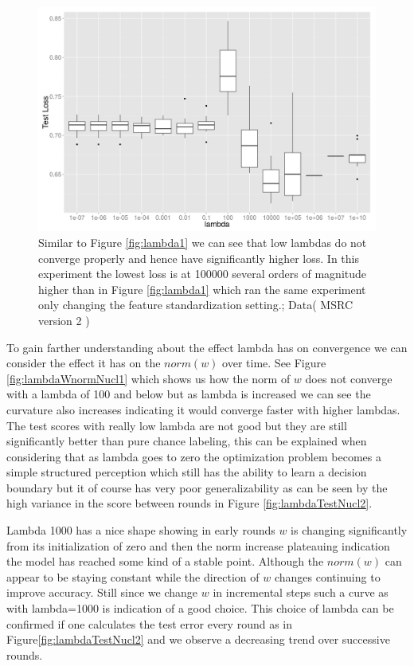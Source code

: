 \begin{figure}
  \centering
  \includegraphics[width=1.0\textwidth]{images/testError_vs_lambda_msrc_stdON.png}
  \caption{  Similar to Figure \ref{fig:lambda1} we can see that low lambdas do not converge properly and hence have significantly higher loss. In this experiment the lowest loss is at 100000 several orders of magnitude higher than in Figure \ref{fig:lambda1} which ran the same experiment only changing the  feature standardization setting.; Data( MSRC version 2 \cite{msrcDataSet} ) 	 } 
  \label{fig:lambdaSTD2}
\end{figure}
\par
To gain farther understanding about the effect lambda has on convergence we can consider the effect it has on the $norm(w)$ over time. See Figure \ref{fig:lambdaWnormNucl1} which shows us how the norm of $w$  does not converge with a lambda of 100 and below but as lambda is increased we can see the curvature also increases indicating it would converge faster with higher lambdas. The test scores with really low lambda are not good but they are still significantly better than pure chance labeling, this can be explained when considering that as lambda goes to zero the optimization problem becomes a simple structured perception which still has the ability to learn a decision boundary but it of course has very poor generalizability as can be seen by the high variance in the score between rounds in Figure \ref{fig:lambdaTestNucl2}. 
\par
Lambda 1000 has a nice shape showing in early rounds $w$ is changing significantly from its initialization of zero and then the norm increase plateauing indication the model has reached some kind of a stable point. Although the $norm(w)$ can appear to be staying constant while the direction of $w$ changes continuing to improve accuracy. Still since we change $w$ in incremental steps such a curve as with lambda=1000 is indication of a good choice. This choice of lambda can be confirmed if one calculates the test error every round as in Figure\ref{fig:lambdaTestNucl2} and we observe a decreasing trend over successive rounds. 
